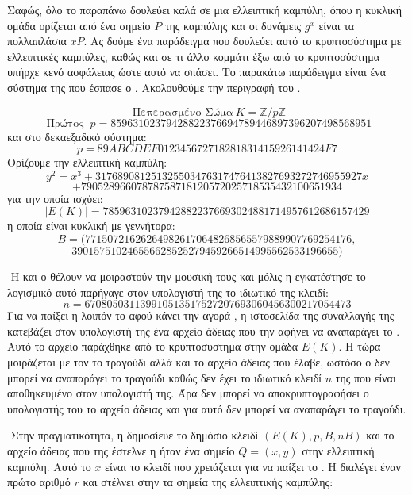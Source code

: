 \documentclass[oneside,a4paper]{article}
\begin{document}
\noindent Σαφώς, όλο το παραπάνω δουλεύει καλά σε μια ελλειπτική καμπύλη, όπου η κυκλική ομάδα ορίζεται από ένα σημείο $P$ της καμπύλης και οι δυνάμεις $g^x$ είναι τα πολλαπλάσια $xP$. Ας δούμε ένα παράδειγμα που δουλεύει αυτό το κρυπτοσύστημα με ελλειπτικές καμπύλες, καθώς και σε τι άλλο κομμάτι έξω από το κρυπτοσύστημα υπήρχε κενό ασφάλειας ώστε αυτό να σπάσει. Το παρακάτω παράδειγμα είναι ένα σύστημα  της  που έσπασε ο . Ακολουθούμε την περιγραφή του  \cite{wstein}.

$$\text{ Πεπερασμένο Σώμα} \ K = \mathbb{Z}/p \mathbb{Z}$$
$$  \text{ Πρώτος } \ p = 85963102379428822376694789446897396207498568951$$ και στο δεκαεξαδικό σύστημα:
$$ p = 89ABCDEF012345672718281831415926141424F7 $$ Ορίζουμε την ελλειπτική καμπύλη:
$$y^2 = x^3 + 317689081251325503476317476413827693272746955927x $$
$$+ 79052896607878758718120572025718535432100651934$$ για την οποία ισχύει:
$$|E(K)| = 785963102379428822376693024881714957612686157429$$ η οποία είναι κυκλική με γεννήτορα:
$$ B  = (771507216262649826170648268565579889907769254176,$$
$$390157510246556628525279459266514995562533196655)$$

$ $\newline
Η  και ο  θέλουν να μοιραστούν την μουσική τους και μόλις η  εγκατέστησε το λογισμικό  αυτό παρήγαγε στον υπολογιστή της το ιδιωτικό της κλειδί:
$$n = 670805031139910513517527207693060456300217054473$$ Για να παίξει η  λοιπόν το  αφού κάνει την αγορά , η ιστοσελίδα της συναλλαγής της κατεβάζει στον υπολογιστή της ένα αρχείο άδειας  που την αφήνει να αναπαράγει το . Αυτό το αρχείο παράχθηκε από το κρυπτοσύστημα  στην ομάδα $E(K)$. Η  τώρα μοιράζεται με τον  το τραγούδι  αλλά και το αρχείο άδειας που έλαβε, ωστόσο ο  δεν μπορεί να αναπαράγει το τραγούδι καθώς δεν έχει το ιδιωτικό κλειδί $n$ της  που είναι αποθηκευμένο στον υπολογιστή της. Άρα δεν μπορεί να αποκρυπτογραφήσει ο υπολογιστής του το αρχείο άδειας και για αυτό δεν μπορεί να αναπαράγει το τραγούδι.

$ $\newline
Στην πραγματικότητα, η  δημοσίευε το δημόσιο κλειδί $(E(K), p, B, nB)$ και το αρχείο άδειας που της έστελνε η  ήταν ένα σημείο $Q= (x,y)$ στην ελλειπτική καμπύλη. Αυτό το $x$ είναι το κλειδί που χρειάζεται για να παίξει το . Η  διαλέγει έναν πρώτο αριθμό $r$ και στέλνει στην  τα σημεία της ελλειπτικής καμπύλης:
\end{document}
